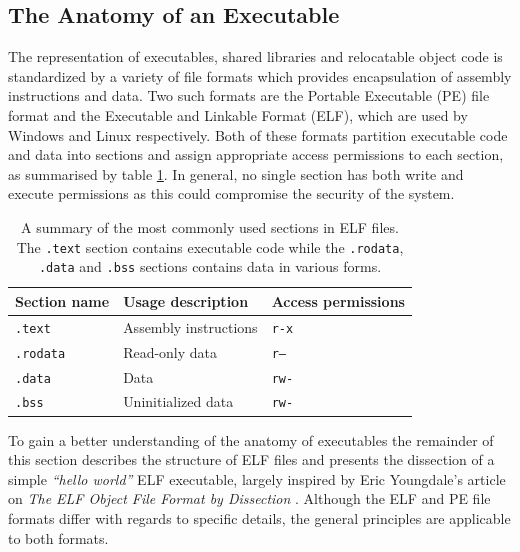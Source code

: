 
\subsection{The Anatomy of an Executable}
\label{sec:lit_review_the_anatomy_of_an_executable}

The representation of executables, shared libraries and relocatable object code is standardized by a variety of file formats which provides encapsulation of assembly instructions and data. Two such formats are the Portable Executable (PE) file format and the Executable and Linkable Format (ELF), which are used by Windows and Linux respectively. Both of these formats partition executable code and data into sections and assign appropriate access permissions to each section, as summarised by table \ref{tbl:elf_sections}. In general, no single section has both write and execute permissions as this could compromise the security of the system.

\begin{table}[htbp]
	\begin{center}
		\begin{tabular}{|l|l|l|}
			\hline
			Section name & Usage description & Access permissions \\
			\hline
			\texttt{.text} & Assembly instructions & \texttt{r-x} \\
			\texttt{.rodata} & Read-only data & \texttt{r--} \\
			\texttt{.data} & Data & \texttt{rw-} \\
			\texttt{.bss} & Uninitialized data & \texttt{rw-} \\
			\hline
		\end{tabular}
	\end{center}
	\caption{A summary of the most commonly used sections in ELF files. The \texttt{.text} section contains executable code while the \texttt{.rodata}, \texttt{.data} and \texttt{.bss} sections contains data in various forms.}
	\label{tbl:elf_sections}
\end{table}

To gain a better understanding of the anatomy of executables the remainder of this section describes the structure of ELF files and presents the dissection of a simple \textit{``hello world''} ELF executable, largely inspired by Eric Youngdale's article on \textit{The ELF Object File Format by Dissection} \cite{elf_by_dissection}. Although the ELF and PE file formats differ with regards to specific details, the general principles are applicable to both formats.

